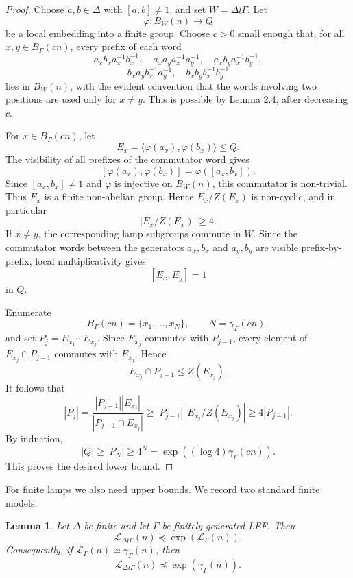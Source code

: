 \documentclass[11pt]{article}
\newcommand{\LEF}{\mathcal L}
\newtheorem{lemma}[theorem]{Lemma}
\begin{document}
\begin{proof}
Choose \(a,b\in\Delta\) with \([a,b]\neq 1\), and set \(W=\Delta\wr\Gamma\). Let
\[
\varphi:B_W(n)\to Q
\]
be a local embedding into a finite group. Choose \(c>0\) small enough that, for all \(x,y\in B_\Gamma(cn)\), every prefix of each word
\[
a_xb_xa_x^{-1}b_x^{-1},\quad
a_xa_ya_x^{-1}a_y^{-1},\quad
a_xb_ya_x^{-1}b_y^{-1},
\]
\[
b_xa_yb_x^{-1}a_y^{-1},\quad
b_xb_yb_x^{-1}b_y^{-1}
\]
lies in \(B_W(n)\), with the evident convention that the words involving two positions are used only for \(x\neq y\). This is possible by Lemma 2.4, after decreasing \(c\).

For \(x\in B_\Gamma(cn)\), let
\[
E_x=\langle\varphi(a_x),\varphi(b_x)\rangle\le Q.
\]
The visibility of all prefixes of the commutator word gives
\[
[\varphi(a_x),\varphi(b_x)]=\varphi([a_x,b_x]).
\]
Since \([a_x,b_x]\neq 1\) and \(\varphi\) is injective on \(B_W(n)\), this commutator is non-trivial. Thus \(E_x\) is a finite non-abelian group. Hence \(E_x/Z(E_x)\) is non-cyclic, and in particular
\[
|E_x/Z(E_x)|\ge 4.
\]
If \(x\neq y\), the corresponding lamp subgroups commute in \(W\). Since the commutator words between the generators \(a_x,b_x\) and \(a_y,b_y\) are visible prefix-by-prefix, local multiplicativity gives
\[
[E_x,E_y]=1
\]
in \(Q\).

Enumerate
\[
B_\Gamma(cn)=\{x_1,\ldots,x_N\},\qquad N=\gamma_\Gamma(cn),
\]
and set \(P_j=E_{x_1}\cdots E_{x_j}\). Since \(E_{x_j}\) commutes with \(P_{j-1}\), every element of \(E_{x_j}\cap P_{j-1}\) commutes with \(E_{x_j}\). Hence
\[
E_{x_j}\cap P_{j-1}\le Z(E_{x_j}).
\]
It follows that
\[
|P_j|=
\frac{|P_{j-1}||E_{x_j}|}{|P_{j-1}\cap E_{x_j}|}
\ge |P_{j-1}|\,|E_{x_j}/Z(E_{x_j})|
\ge 4|P_{j-1}|.
\]
By induction,
\[
|Q|\ge |P_N|\ge 4^N=\exp((\log 4)\gamma_\Gamma(cn)).
\]
This proves the desired lower bound.
\end{proof}

For finite lamps we also need upper bounds. We record two standard finite models.

\begin{lemma}
Let \(\Delta\) be finite and let \(\Gamma\) be finitely generated LEF. Then
\[
\LEF_{\Delta\wr\Gamma}(n)\preceq \exp(\LEF_\Gamma(n)).
\]
Consequently, if \(\LEF_\Gamma(n)\simeq\gamma_\Gamma(n)\), then
\[
\LEF_{\Delta\wr\Gamma}(n)\preceq \exp(\gamma_\Gamma(n)).
\]
\end{lemma}
\end{document}
